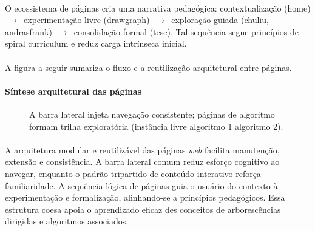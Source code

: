 \documentclass[12pt,a4paper]{article}
\def\texttt#1{#1}%
\def\emph#1{#1}%
\def\_{}%
\begin{document}
\paragraph{}
O ecossistema de páginas cria uma narrativa pedagógica: contextualização (\texttt{home}) \,$\rightarrow$\, experimentação livre (\texttt{draw\_graph}) \,$\rightarrow$\, exploração guiada (\texttt{chuliu}, \texttt{andrasfrank}) \,$\rightarrow$\, consolidação formal (\texttt{tese}). Tal sequência segue princípios de \emph{spiral curriculum} e reduz carga intrínseca inicial.

\paragraph{}
A figura a seguir sumariza o fluxo e a reutilização arquitetural entre páginas.


\paragraph{Síntese arquitetural das páginas}
\begin{figure}[H]\centering
    \caption{A \texttt{barra lateral} injeta navegação consistente; páginas de algoritmo formam trilha exploratória (instância livre \textrightarrow algoritmo 1 \textrightarrow algoritmo 2).}
\end{figure}

\paragraph{}
A arquitetura modular e reutilizável das páginas \textit{web} facilita manutenção, extensão e consistência. A barra lateral comum reduz esforço cognitivo ao navegar, enquanto o padrão tripartido de conteúdo interativo reforça familiaridade. A sequência lógica de páginas guia o usuário do contexto à experimentação e formalização, alinhando-se a princípios pedagógicos. Essa estrutura coesa apoia o aprendizado eficaz des conceitos de arborescências dirigidas e algoritmos associados.
\end{document}
